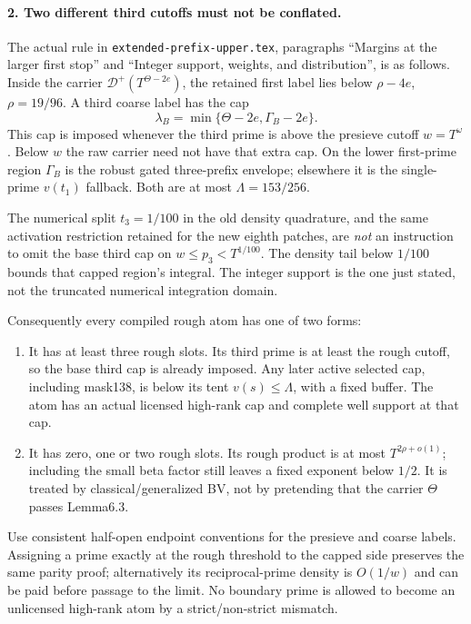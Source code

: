 \paragraph{2. Two different third cutoffs must not be conflated.}
The actual rule in \texttt{extended-prefix-upper.tex}, paragraphs
``Margins at the larger first stop'' and ``Integer support, weights,
and distribution'', is as follows. Inside the carrier
$\mathcal D^+(T^{\Theta-2e})$, the retained first label lies below
$\rho-4e$, $\rho=19/96$. A third coarse label has the cap
\[
 \lambda_B=\min\{\Theta-2e,\Gamma_B-2e\}.
\]
This cap is imposed whenever the third prime is above the presieve
cutoff $w=T^\omega$. Below $w$ the raw carrier need not have that
extra cap. On the lower first-prime region $\Gamma_B$ is the robust
gated three-prefix envelope; elsewhere it is the single-prime
$v(t_1)$ fallback. Both are at most $\Lambda=153/256$.

The numerical split $t_3=1/100$ in the old density quadrature, and
the same activation restriction retained for the new eighth
patches, are \emph{not} an instruction to omit the base third cap
on $w\le p_3<T^{1/100}$. The density tail below $1/100$ bounds
that capped region's integral. The integer support is the one just
stated, not the truncated numerical integration domain.

Consequently every compiled rough atom has one of two forms:
\begin{enumerate}
\item It has at least three rough slots. Its third prime is at least
the rough cutoff, so the base third cap is already imposed. Any
later active selected cap, including mask138, is below its tent
$v(s)\le\Lambda$, with a fixed buffer. The atom has an actual
licensed high-rank cap and complete well support at that cap.
\item It has zero, one or two rough slots. Its rough product is at
most $T^{2\rho+o(1)}$; including the small beta factor still leaves
a fixed exponent below $1/2$. It is treated by classical/generalized
BV, not by pretending that the carrier $\Theta$ passes Lemma6.3.
\end{enumerate}
Use consistent half-open endpoint conventions for the presieve and
coarse labels. Assigning a prime exactly at the rough threshold to
the capped side preserves the same parity proof; alternatively its
reciprocal-prime density is $O(1/w)$ and can be paid before passage
to the limit. No boundary prime is allowed to become an unlicensed
high-rank atom by a strict/non-strict mismatch.

